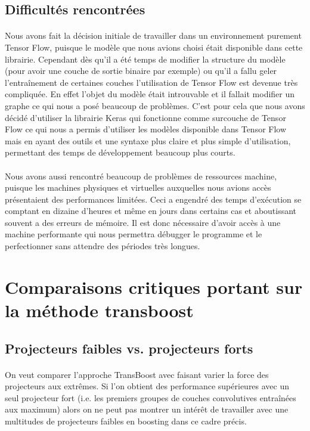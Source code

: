 \documentclass[11 pt]{article}
\begin{document}
\subsection{Difficultés rencontrées}
\paragraph{}Nous avons fait la décision initiale de travailler dans un environnement purement Tensor Flow, puisque le modèle que nous avions choisi était disponible dans cette librairie. Cependant dès qu’il a été temps de modifier la structure du modèle (pour avoir une couche de sortie binaire par exemple) ou qu’il a fallu geler l'entraînement de certaines couches l’utilisation de Tensor Flow est devenue très compliquée. En effet l’objet du modèle était introuvable et il fallait modifier un graphe ce qui nous a posé beaucoup de problèmes. C’est pour cela que nous avons décidé d’utiliser la librairie Keras qui fonctionne comme surcouche de Tensor Flow ce qui nous a permis d’utiliser les modèles disponible dans Tensor Flow mais en ayant des outils et une syntaxe plus claire et plus simple d’utilisation, permettant des temps de développement beaucoup plus courts.

\paragraph{}Nous avons aussi rencontré beaucoup de problèmes de ressources machine, puisque les machines physiques et virtuelles auxquelles nous avions accès présentaient des performances limitées. Ceci a engendré des temps d'exécution se comptant en dizaine d’heures et même en jours dans certains cas et aboutissant souvent a des erreurs de mémoire. Il est donc nécessaire d’avoir accès à une machine performante qui nous permettra débugger le programme et le perfectionner sans attendre des périodes très longues. 

\section{Comparaisons critiques portant sur la méthode transboost}
\subsection{Projecteurs faibles vs. projecteurs forts}
\paragraph{}On veut comparer l’approche TransBoost avec faisant varier la force des projecteurs aux extrêmes. Si l’on obtient des performance supérieures avec un seul projecteur fort (i.e. les premiers groupes de couches convolutives entraînées aux maximum) alors on ne peut pas montrer un intérêt de travailler avec une multitudes de projecteurs faibles en boosting dans ce cadre précis.
\end{document}
